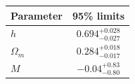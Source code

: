 \begin{tabular} { l  c}

 Parameter &  95\% limits\\
\hline
{\boldmath$h              $} & $0.694^{+0.028}_{-0.027}   $\\

{\boldmath$Ω_m            $} & $0.284^{+0.018}_{-0.017}   $\\

{\boldmath$M              $} & $-0.04^{+0.83}_{-0.80}     $\\
\hline
\end{tabular}